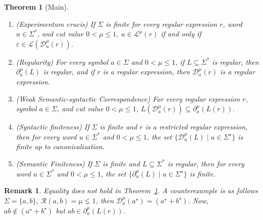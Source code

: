 \documentclass{article}
\newcommand{\cR}{{\mathcal R}}
\newtheorem{theorem}{Theorem}[section]
\newtheorem{remark}{Remark}[section]
\begin{document}
\begin{theorem}[Main]\label{the:fuzzyderivative}\hfill \begin{enumerate}
\item (Experimentum crucis) If $\Sigma$ is finite for every regular expression $r$, word $u\in \Sigma^\ast$, and cut value
$0<\mu\le1$, $ u\in \mathcal L^\mu(r)$ if and only if $\varepsilon \in \mathcal L(
\mathcal D_u^\mu(r)).
$
\item (Regularity) For every symbol $a\in\Sigma$ and $0<\mu\le1$, if $L\subseteq\Sigma^\ast$ is regular, then
$\partial_a^\mu(L)$ is regular, and if $r$ is a regular expression, then $\mathcal D_a^\mu(r)$ is a regular expression.
\item ({\color{red}Weak} Semantic-syntactic Correspondence) For every regular expression $r$, symbol \mbox{$a\in\Sigma$}, and cut value
$0<\mu\le1$, $
L(\mathcal D_a^\mu(r))
\subseteq
\partial_a^\mu(L(r)).
$
\item (Syntactic finiteness) If $\Sigma$ is finite and $r$ is a restricted regular expression, then for every word $u\in \Sigma^\ast$ and $0<\mu\le1$, the set
$
\{\mathcal D_u^\mu(L)\mid u\in\Sigma^\star\}$ is finite up to canonicalization.
\item (Semantic Finiteness) If $\Sigma$ is finite and $L\subseteq\Sigma^\ast$ is regular, then for every word $u\in \Sigma^\ast$ and $0<\mu\le1$, the set
$
\{\partial_u^\mu(L)\mid u\in \Sigma^\star\}
$
is finite. 
\end{enumerate}
\end{theorem}

{\color{red}\begin{remark}\label{mismatch} Equality does not hold in Theorem~\ref{the:fuzzyderivative}. A counterexample is as follows $\Sigma=\{a,b\}$, $\cR(a,b)=\mu \lneq 1$, then $\mathcal D^\mu_a(a^\star)=(a^\star+b^\star)$. Now, $ab\notin (a^\star+b^\star)$ but $ab \in \partial_a^\mu(L(r))$. 
\end{remark}}

\end{document}
